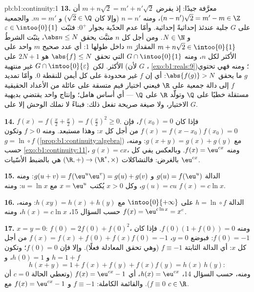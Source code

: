 \begin{solution}{pb:b1:continuity:1}
\textbf{13.} معرَّفة جيدًا: إذ يفرض $m + n\sqrt2 = m' + n'\sqrt2$ أن
$(n - n')\sqrt2 = m' - m \in \Z$، ومنه $n = n'$ (وإلا كان $\sqrt2 \in
\Q$) و $m = m'$. والجمعية على $G$ جلية عندئذ إحداثيةً
إحداثية. وأمّا عدم الحدّية بجوار $0^+$: فثبّت $\varepsilon \in
\intoo{0}{1}$ و $N \in \N$. ومن أجل كل $n$ مثبَّت يحقق $\abs n
\leq N$، يثبّت الشرطُ $m + n\sqrt2 \in \intoo{0}{1}$ المقدارَ $m$
داخل  طولها $1$: أي عدد صحيح $m$ واحد على الأكثر لكل
$n$، ومنه  $G \cap \intoo{0}{1}$ التي تحقق
$\abs{f} \leq N$ هو $2N + 1$ على الأكثر. لكن $G \cap \intoo{0}{\varepsilon}$
غير منتهية (لأن $G$ ، \cref{exo:b1:reals:9})؛ ومنه فهي
تحتوي $g$ ما يحقق $\abs{f(g)} > N$: أي إن $f$ غير محدودة على
كل  أيمن للنقطة $0$. وأمّا تمديد $f$ إلى دالة
جمعية على $\R$ فيعني اختيار قيم متسقة على عائلة من
الأعداد الحقيقية مستقلة خطيًا على $\Q$ وتولّد $\R$ على $\Q$
--- أي أساس هامل؛ وإنتاج واحد يقتضي بديهية الاختيار،
ولا صيغة صريحة تفعل ذلك: فبناءً لا نملك
الوحش إلا على $G$.

\textbf{14.} $f(x) = f(\frac x2 + \frac x2) = f(\frac x2)^2 \geq
0$. فإذا كان $f(x_0) = 0$، فإن $f(x) = f(x - x_0)f(x_0) = 0$ من أجل كل
$x$: وهذا مستبعد. ومنه $f > 0$ وتكون $g = \ln \circ f$ 
(\cref{prop:b1:continuity:algebra}) مع $g(x + y) = g(x) +
g(y)$: ومنه، حسب \cref{exo:b1:continuity:11}، $g(x) = cx$، ومنه $f(x) =
\eu^{cx}$. وبالعكس يفي كل $\eu^{cx}$ بالغرض: فالتشاكلات
 $(\R, +) \to (\R^*, \times)$ هي بالضبط
الأسّيات.

\textbf{15.} الدالة $g(u) = f(\eu^u)$  و $g(u + v) =
f(\eu^u \eu^v) = g(u) + g(v)$: ومنه $g(u) = cu$، وكل $x > 0$
يُكتب $x = \eu^u$ مع $u = \ln x$: ومنه $f(x) = c\ln x$.

\textbf{16.} الدالة $h = \ln \circ f$  على
$\intoo{0}{+\infty}$ مع $h(xy) = h(x) + h(y)$: ومنه، حسب السؤال 15،
$h(x) = c\ln x$، ومنه $f(x) = \eu^{c\ln x} = x^c$.

\textbf{17.} $x = y = 0$: $f(0) = 2f(0) + f(0)^2$، ومنه $f(0)(1 +
f(0)) = 0$. فإذا كان $f(0) = -1$: فبوضع $y = 0$، $f(x) = f(x) +
f(0) + f(x)f(0) = -1$ من أجل كل $x$: أي الدالة الثابتة $f \equiv -1$
(وهي تحقق المعادلة فعلًا). وإلا فإن $f(0) = 0$؛ وتكون $h
= 1 + f$  و $h(0) = 1$، و
\[
h(x + y) = 1 + f(x) + f(y) + f(x)f(y) = h(x)\,h(y) :
\]
ومنه، حسب السؤال 14، $h(x) = \eu^{cx}$، أي $f(x) = \eu^{cx} - 1$
(وتعطي الحالة $c = 0$ أن $f \equiv 0$). والقائمة الكاملة: $f
\equiv -1$ و $f(x) = \eu^{cx} - 1$ مع $c \in \R$.


\end{solution}

